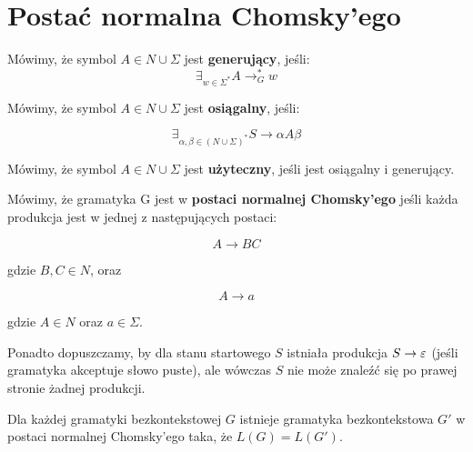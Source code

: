  \section{Postać normalna Chomsky'ego}

\begin{definition}
    Mówimy, że symbol \(A \in N \cup \Sigma \) jest \textbf{generujący}, jeśli: 
    \[ 
    \exists_{w \in \Sigma^*}A \rightarrow_{G}^* w
    \] 
    
\end{definition}

\begin{definition}
    Mówimy, że symbol \(A \in N \cup \Sigma\) jest \textbf{osiągalny}, jeśli: 
    
    \[ 
        \exists_{\alpha, \beta \in (N \cup \Sigma)^*} S \rightarrow \alpha A \beta 
    \]
\end{definition}

\begin{definition}
    Mówimy, że symbol \(A \in N \cup \Sigma \) jest \textbf{użyteczny}, jeśli jest osiągalny i generujący. 
\end{definition}

\begin{definition}
    Mówimy, że gramatyka G jest w \textbf{postaci normalnej Chomsky'ego} jeśli każda produkcja jest w jednej z następujących postaci: 
    
    \[
        A \rightarrow BC 
    \]
    
    gdzie \(B, C \in N \), oraz 
    
    \[ 
        A \rightarrow a
    \]
    
    gdzie \(A \in N\) oraz \(a \in \Sigma\). 
    
    Ponadto dopuszczamy, by dla stanu startowego \(S\) istniała produkcja \(S \rightarrow \varepsilon\) (jeśli gramatyka akceptuje słowo puste), ale wówczas \(S\) nie może znaleźć się po prawej stronie żadnej produkcji. 
    
\end{definition}

\begin{theorem}
    Dla każdej gramatyki bezkontekstowej \(G\) istnieje gramatyka bezkontekstowa \(G'\) w postaci normalnej Chomsky'ego taka, że \(L(G) = L(G')\). 
\end{theorem}

